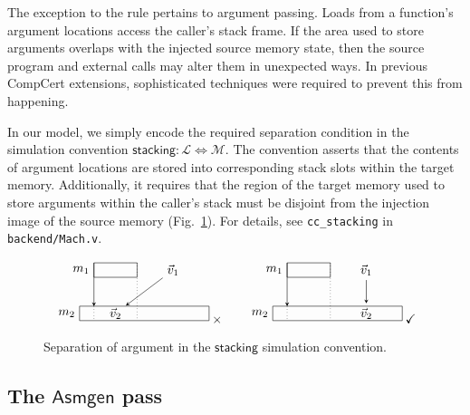 \documentclass[draft,11pt]{report}
\newcommand{\kw}[1]{\ensuremath{ \mathsf{#1} }}
\begin{document}
The exception to the rule pertains to argument passing.
Loads from a function's argument locations
access the caller's stack frame.
If the area used to store arguments
overlaps with the injected source memory state,
then the source program and external calls
may alter them in unexpected ways.
In previous CompCert extensions,
sophisticated techniques were required
to prevent this from happening.

In our model,
we simply encode the required separation condition
in the simulation convention
$\kw{stacking} : \mathcal{L} \Leftrightarrow \mathcal{M}$.
The convention
asserts that the contents of argument locations
are stored into corresponding stack slots
within the target memory.
Additionally, it
requires that the region of the target memory
used to store arguments within the caller's stack
must be disjoint from the injection image of the source memory
(Fig.~\ref{fig:stacking}).
For details,
see \texttt{cc\_stacking} in \texttt{backend/Mach.v}.

\begin{figure}
\[
  \begin{tikzpicture}[scale=0.4,>=stealth]
    \draw ( 1,3) rectangle +(3,1); \node[left] at (1,3.5) {$m_1$};
    \draw ( 0,0) rectangle +(9,1); \node[left] at (0,0.5) {$m_2$};
    \node (V1) at (6.5,3.5) {$\vec{v}_1$};
    \node (V2) at (2.5,0.5) {$\vec{v}_2$};
    \draw[->] (1,4) -- (1,1); \draw[dotted] (1,1) -- (1,0); \draw[dotted] (4,4) -- (4,0);
    \draw[->] (V1) -- (V2);
  \end{tikzpicture}
  \:{\times}
  \qquad
  \begin{tikzpicture}[scale=0.4,>=stealth]
    \draw ( 1,3) rectangle +(3,1); \node[left] at (1,3.5) {$m_1$};
    \draw ( 0,0) rectangle +(9,1); \node[left] at (0,0.5) {$m_2$};
    \node (V1) at (6.5,3.5) {$\vec{v}_1$};
    \node (V2) at (6.5,0.5) {$\vec{v}_2$};
    \draw[->] (1,4) -- (1,1); \draw[dotted] (1,1) -- (1,0); \draw[dotted] (4,4) -- (4,0);
    \draw[->] (V1) -- (V2);
  \end{tikzpicture}
  \:{\checkmark}
\]
  \caption{Separation of argument
    in the \kw{stacking} simulation convention.}
  \label{fig:stacking}
\end{figure}


\subsection{The \kw{Asmgen} pass} \label{sec:asmgen} %
\end{document}
